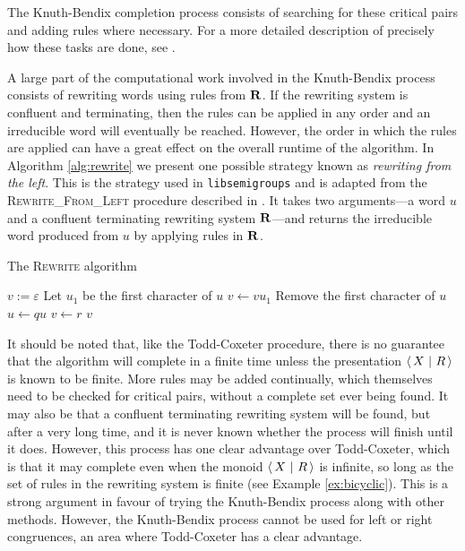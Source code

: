 The Knuth-Bendix completion process consists of searching for these critical
pairs and adding rules where necessary.  For a more detailed description of
precisely how these tasks are done, see \cite[\S 2.6]{sims}.

A large part of the computational work involved in the Knuth-Bendix process
consists of rewriting words using rules from $\mathbf{R}$.  If the rewriting system is
confluent and terminating, then the rules can be applied in any order and an
irreducible word will eventually be reached.  However, the order in which the
rules are applied can have a great effect on the overall runtime of the
algorithm.  In Algorithm \ref{alg:rewrite} we present one possible strategy
known as \textit{rewriting from the left}.  This is the strategy used in
\texttt{libsemigroups} \cite{libsemigroups} and is adapted from the
\textsc{Rewrite\_From\_Left} procedure described in \cite[\S 2.4]{sims}.  It
takes two arguments---a word $u$ and a confluent terminating rewriting system
$\mathbf{R}$---and returns the irreducible word produced from $u$ by applying rules in
$\mathbf{R}$.

\begin{algorithm}
\caption{The \textsc{Rewrite} algorithm}
\label{alg:rewrite}
\begin{algorithmic}[1]
\State $v := \varepsilon$
  \State Let $u_1$ be the first character of $u$
  \State $v \gets v u_1$
  \State Remove the first character of $u$
      \State $u \gets qu$
      \State $v \gets r$
      \State \Break
    \EndIf
  \EndFor
\EndWhile
\State \Return $v$
\EndProcedure
\end{algorithmic}
\end{algorithm}

It should be noted that, like the
Todd-Coxeter procedure, there is no guarantee that the algorithm will complete
in a finite time unless the presentation $\left\langle\,X ~\middle|~ R\,\right\rangle$ is known to be finite.
More rules may be added continually, which themselves need to
be checked for critical pairs, without a complete set ever being found.  It may
also be that a confluent terminating rewriting system will be found, but after a
very long time, and it is never known whether the process will finish until it
does.  However, this process has one clear advantage over Todd-Coxeter, which is
that it may complete even when the monoid $\left\langle\,X ~\middle|~ R\,\right\rangle$ is infinite, so long as
the set of rules in the rewriting system is finite
(see Example \ref{ex:bicyclic}).  This is a strong argument
in favour of trying the Knuth-Bendix process along with other methods.  However,
the Knuth-Bendix process cannot be used for left or right congruences, an area
where Todd-Coxeter has a clear advantage.

